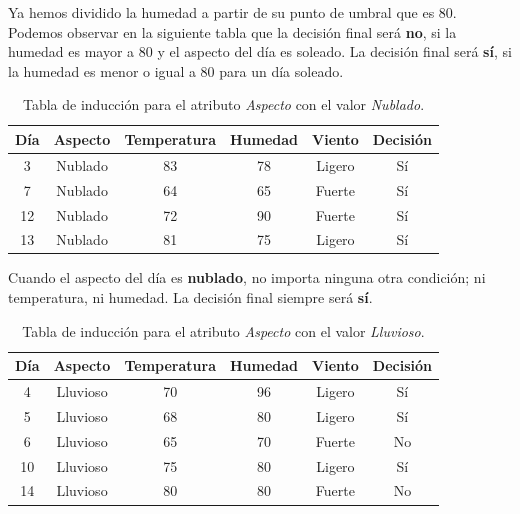 \begin{UClist}
	Ya hemos dividido la humedad a partir de su punto de umbral que es 80. Podemos observar en la siguiente tabla que la decisión final será \textbf{no}, si la humedad es mayor a 80 y el aspecto del día es soleado. La decisión final será \textbf{sí}, si la humedad es menor o igual a 80 para un día soleado.\\

	\begin{table}[H]
		\begin{center}
			\label{tab:tablaNubladoC4.5}
			\begin{tabular}{c|c|c|c|c|c}
				\textbf{Día} & \textbf{Aspecto} & \textbf{Temperatura} & \textbf{Humedad} & \textbf{Viento} & \textbf{Decisión}\\
				\hline
				3 & Nublado & 83 & 78 & Ligero & Sí\\
				7 & Nublado & 64 & 65 & Fuerte & Sí\\
				12 & Nublado & 72 & 90 & Fuerte & Sí\\
				13 & Nublado & 81 & 75 & Ligero & Sí\\
			\end{tabular}
		\end{center}
		\caption{Tabla de inducción para el atributo \emph{Aspecto} con el valor \emph{Nublado}.}
	\end{table}

	Cuando el aspecto del día es \textbf{nublado}, no importa ninguna otra condición; ni temperatura, ni humedad. La decisión final siempre será \textbf{sí}.\\

	\begin{table}[H]
		\begin{center}
			\label{tab:tablaLluviosoC4.5}
			\begin{tabular}{c|c|c|c|c|c}
				\textbf{Día} & \textbf{Aspecto} & \textbf{Temperatura} & \textbf{Humedad} & \textbf{Viento} & \textbf{Decisión}\\
				\hline
				4 & Lluvioso & 70 & 96 & Ligero & Sí\\
				5 & Lluvioso & 68 & 80 & Ligero & Sí\\
				6 & Lluvioso & 65 & 70 & Fuerte & No\\
				10 & Lluvioso & 75 & 80 & Ligero & Sí\\
				14 & Lluvioso & 80 & 80 & Fuerte & No\\
			\end{tabular}
		\end{center}
		\caption{Tabla de inducción para el atributo \emph{Aspecto} con el valor \emph{Lluvioso}.}
	\end{table}


\end{UClist}
